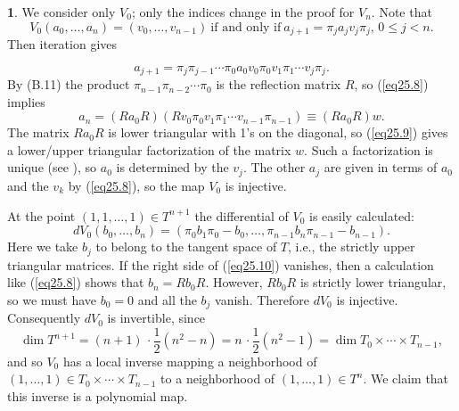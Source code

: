 \documentclass{surv-l}
\theoremstyle{plain}
\theoremstyle{definition}
\newtheorem*{pf}{\sc{Proof}}
\numberwithin{equation}{chapter}
\begin{document}
\begin{pf}
We consider only $V_{0}$; only the indices change in the proof for $V_{n}$. Note that
\begin{equation*}
V_{0} (a_{0}, \ldots,a_{n})=(v_{0}, \ldots, v_{n-1})\ \text{if and only if}\ a_{j+1}=\pi_{j}a_{j}v_{j}\pi_{j},\, 0\leq j<n.
\end{equation*}
Then iteration gives

\begin{equation}\label{eq25.8}
a_{j+1}=\pi_{j}\pi_{j-1}\cdots\pi_{0}a_{0}v_{0}\pi_{0}v_{1}\pi_{1}\cdots v_{j}\pi_{j}.
\end{equation}
By (B.11) the product $\pi_{n-1}\pi_{n-2}\cdots \pi_{0}$ is the reflection matrix $R$, so (\ref{eq25.8}) implies
\begin{equation}\label{eq25.9}
a_{n}=(Ra_{0}R)(Rv_{0}\pi_{0}v_{1}\pi_{1}\cdots v_{n-1}\pi_{n-1})\equiv(Ra_{0}R)w.
\end{equation}
The matrix $Ra_{0}R$ is lower triangular with 1's on the diagonal, so (\ref{eq25.9}) gives a lower/upper triangular factorization of the matrix $w$. Such a factorization is unique (see \cite{Str}), so $a_{0}$ is determined by the $v_{j}$. The other $a_{j}$ are given in terms of $a_{0}$ and the $v_{k}$ by (\ref{eq25.8}), so the map $V_{0}$ is injective.
\end{pf}

At the point $(1, 1, \ldots, 1)\in T^{n+1}$ the differential of $V_{0}$ is easily calculated:
\begin{equation}\label{eq25.10}
dV_{0}(b_{0},\ldots, b_{n})=(\pi_{0}b_{1}\pi_{0}-b_{0},\ldots, \pi_{n-1}b_{n}\pi_{n-1}-b_{n-1}).
\end{equation}
Here we take $b_{j}$ to belong to the tangent space of $T$, i.e., the strictly upper triangular matrices. If the right side of (\ref{eq25.10}) vanishes, then a calculation like (\ref{eq25.8}) shows that $b_{n}=Rb_{0}R$. However, $Rb_{0}R$ is strictly lower triangular, so we must have $b_{0}=0$ and all the $b_{j}$ vanish. Therefore $dV_{0}$ is injective. Consequently $dV_{0}$ is invertible, since
\begin{equation*}
\dim T^{n+1}=(n+1)\,\cdot{\scriptstyle\frac{1}{2}}(n^{2}-n)=n\,\cdot  {\scriptstyle\frac{1}{2}}(n^{2}-1)=\dim T_{0}\times\cdots \times T_{n-1},
\end{equation*}
and so $V_{0}$ has a local inverse mapping a neighborhood of $(1,\ldots, 1)\in T_{0}\times\cdots\times T_{n-1}$ to a neighborhood of $(1,\ldots, 1) \in T^{n}$. We claim that this inverse is a polynomial map.
\end{document}
